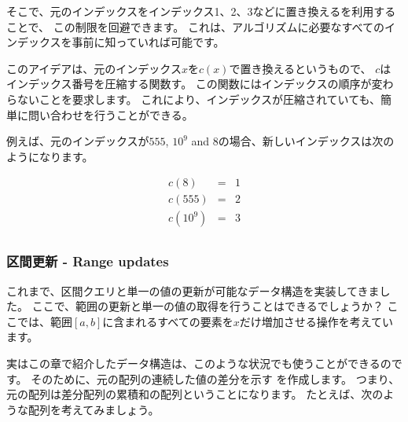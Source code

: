 
そこで、元のインデックスをインデックス1、2、3などに置き換えるを利用することで、
この制限を回避できます。
これは、アルゴリズムに必要なすべてのインデックスを事前に知っていれば可能です。

このアイデアは、元のインデックス$x$を$c(x)$で置き換えるというもので、
$c$は インデックス番号を圧縮する関数す。
この関数にはインデックスの順序が変わらないことを要求します。
これにより、インデックスが圧縮されていても、簡単に問い合わせを行うことができる。

例えば、元のインデックスが$555$, $10^9$ and $8$の場合、新しいインデックスは次のようになります。

\[
\begin{array}{lcl}
c(8) & = & 1 \\
c(555) & = & 2 \\
c(10^9) & = & 3 \\
\end{array}
\]

\subsubsection{区間更新 - Range updates}

これまで、区間クエリと単一の値の更新が可能なデータ構造を実装してきました。
ここで、範囲の更新と単一の値の取得を行うことはできるでしょうか？
ここでは、範囲$[a, b]$に含まれるすべての要素を$x$だけ増加させる操作を考えています。


実はこの章で紹介したデータ構造は、このような状況でも使うことができるのです。
そのために、元の配列の連続した値の差分を示す
を作成します。
つまり、元の配列は差分配列の累積和の配列ということになります。
たとえば、次のような配列を考えてみましょう。

\begin{center}
\end{center}

